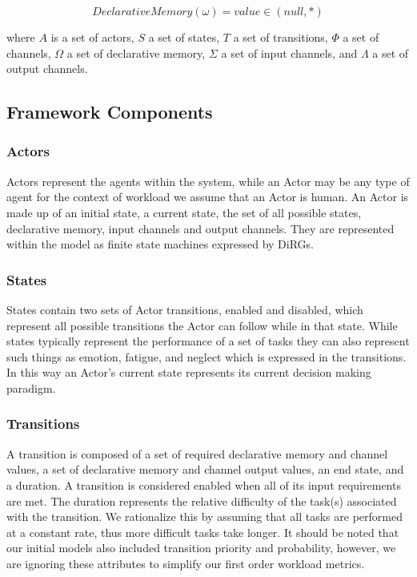 \begin{equation}
Declarative Memory(\omega) = value \in (null, *)
\end{equation}


\noindent where $A$ is a set of actors, $S$ a set of
states, $T$ a set of transitions, $\Phi$ a set of channels, $\Omega$ a set of
declarative memory, $\Sigma$ a set of input channels, and $\Lambda$ a set of
output channels.

\subsection{Framework Components}
\subsubsection{Actors}
Actors represent the agents within the system, while an Actor may be any type of
agent for the context of workload we assume that an Actor is human.  An Actor is
made up of an initial state, a current state, the set of all possible states,
declarative memory, input channels and output channels.  They are represented
within the model as finite state machines expressed by DiRGs.

\subsubsection{States}
States contain two sets of Actor transitions, enabled and disabled, which
represent all possible transitions the Actor can follow while in that state. 
While states typically represent the performance of a set of tasks they can also
represent such things as emotion, fatigue, and neglect which is expressed in the
transitions.  In this way an Actor's current state represents its current
decision making paradigm.

\subsubsection{Transitions}
A transition is composed of a set of required declarative memory and channel
values, a set of declarative memory and channel output values, an end state, and
a duration.  A transition is considered enabled when all of its input
requirements are met.  The duration represents the relative difficulty of the
task(s) associated with the transition.  We rationalize this by assuming that
all tasks are performed at a constant rate, thus more difficult tasks take
longer.  It should be noted that our initial models also included transition
priority and probability, however, we are ignoring these attributes to simplify
our first order workload metrics.

